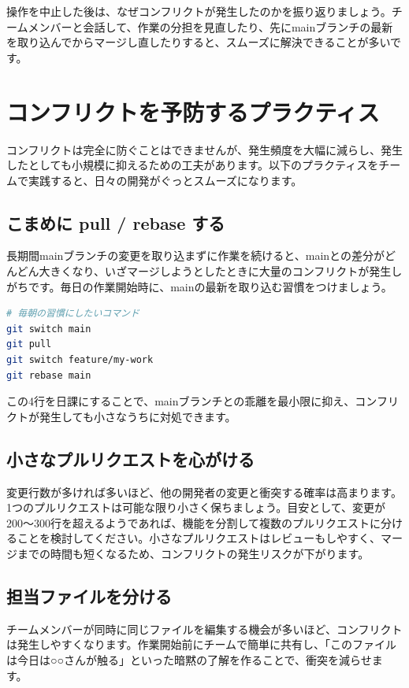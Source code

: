 操作を中止した後は、なぜコンフリクトが発生したのかを振り返りましょう。チームメンバーと会話して、作業の分担を見直したり、先にmainブランチの最新を取り込んでからマージし直したりすると、スムーズに解決できることが多いです。

\section{コンフリクトを予防するプラクティス}

コンフリクトは完全に防ぐことはできませんが、発生頻度を大幅に減らし、発生したとしても小規模に抑えるための工夫があります。以下のプラクティスをチームで実践すると、日々の開発がぐっとスムーズになります。

\subsection{こまめに pull / rebase する}

長期間mainブランチの変更を取り込まずに作業を続けると、mainとの差分がどんどん大きくなり、いざマージしようとしたときに大量のコンフリクトが発生しがちです。毎日の作業開始時に、mainの最新を取り込む習慣をつけましょう。

\begin{lstlisting}[language=bash]
# 毎朝の習慣にしたいコマンド
git switch main
git pull
git switch feature/my-work
git rebase main
\end{lstlisting}

この4行を日課にすることで、mainブランチとの乖離を最小限に抑え、コンフリクトが発生しても小さなうちに対処できます。

\subsection{小さなプルリクエストを心がける}

変更行数が多ければ多いほど、他の開発者の変更と衝突する確率は高まります。1つのプルリクエストは可能な限り小さく保ちましょう。目安として、変更が200〜300行を超えるようであれば、機能を分割して複数のプルリクエストに分けることを検討してください。小さなプルリクエストはレビューもしやすく、マージまでの時間も短くなるため、コンフリクトの発生リスクが下がります。

\subsection{担当ファイルを分ける}

チームメンバーが同時に同じファイルを編集する機会が多いほど、コンフリクトは発生しやすくなります。作業開始前にチームで簡単に共有し、「このファイルは今日は○○さんが触る」といった暗黙の了解を作ることで、衝突を減らせます。

